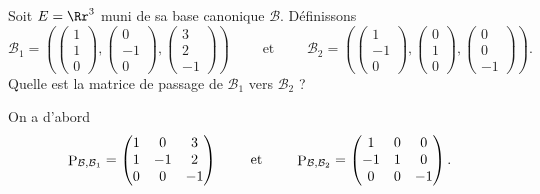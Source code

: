 \documentclass[class=report,crop=false]{standalone}
\begin{document}
\begin{exemple}
\label{ex:matpassag}
Soit $E = \Rr^3$ muni de sa base canonique $\mathcal{B}$.
Définissons
$$\mathcal{B}_1 =
\left(
\begin{pmatrix} 1\\1\\0\end{pmatrix},
\begin{pmatrix} 0 \\ -1 \\ 0\end{pmatrix},
\begin{pmatrix} 3\\2\\-1\end{pmatrix}
\right)
\qquad \text{ et } \qquad
\mathcal{B}_2 =
\left(
\begin{pmatrix} 1\\-1\\0\end{pmatrix},
\begin{pmatrix} 0 \\ 1 \\ 0\end{pmatrix},
\begin{pmatrix} 0\\0\\-1\end{pmatrix}
\right).$$
Quelle est la matrice de passage de $\mathcal{B}_1$ vers $\mathcal{B}_2$ ?


On a d'abord
$$\mathop{\mathrm{P}}\nolimits_{\mathcal{B}, \mathcal{B}_1} =
\begin{pmatrix}
1 & 0 & 3\\
1 & -1 & 2\\
0 & 0 &-1
\end{pmatrix}
\qquad \text{ et } \qquad
\mathop{\mathrm{P}}\nolimits_{\mathcal{B}, \mathcal{B}_2} =
\begin{pmatrix}
1 & 0 & 0\\
-1 & 1 & 0\\
0 & 0 &-1
\end{pmatrix}.$$


\end{exemple}
\end{document}
